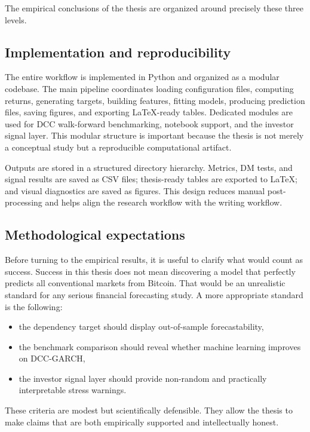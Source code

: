 The empirical conclusions of the thesis are organized around precisely these three levels.

\subsection{Implementation and reproducibility}

The entire workflow is implemented in Python and organized as a modular codebase. The main pipeline coordinates loading configuration files, computing returns, generating targets, building features, fitting models, producing prediction files, saving figures, and exporting \LaTeX-ready tables. Dedicated modules are used for DCC walk-forward benchmarking, notebook support, and the investor signal layer. This modular structure is important because the thesis is not merely a conceptual study but a reproducible computational artifact.

Outputs are stored in a structured directory hierarchy. Metrics, DM tests, and signal results are saved as CSV files; thesis-ready tables are exported to \LaTeX; and visual diagnostics are saved as figures. This design reduces manual post-processing and helps align the research workflow with the writing workflow.

\subsection{Methodological expectations}

Before turning to the empirical results, it is useful to clarify what would count as success. Success in this thesis does not mean discovering a model that perfectly predicts all conventional markets from Bitcoin. That would be an unrealistic standard for any serious financial forecasting study. A more appropriate standard is the following:

\begin{itemize}
    \item the dependency target should display out-of-sample forecastability,
    \item the benchmark comparison should reveal whether machine learning improves on DCC-GARCH,
    \item the investor signal layer should provide non-random and practically interpretable stress warnings.
\end{itemize}

These criteria are modest but scientifically defensible. They allow the thesis to make claims that are both empirically supported and intellectually honest.

